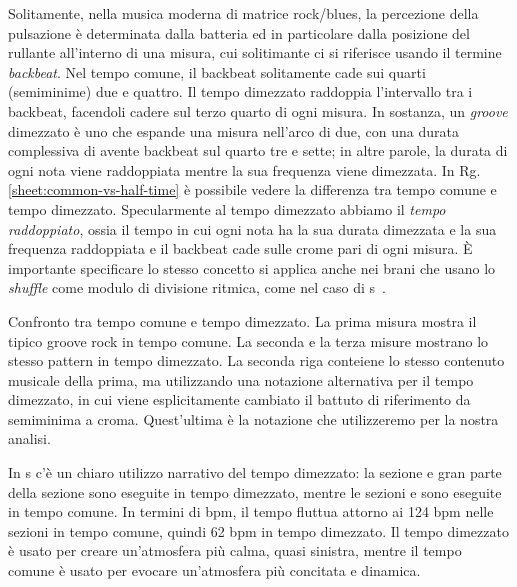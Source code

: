\documentclass[class=book, crop=false, oneside, 12pt]{standalone}
\begin{document}
    Solitamente, nella musica moderna di matrice rock/blues, la percezione della pulsazione  è determinata dalla batteria ed in particolare dalla posizione del rullante all'interno di una misura, cui solitimante ci si riferisce usando il termine \emph{backbeat}. Nel tempo comune, il backbeat solitamente cade  sui quarti (semiminime) due e quattro. Il tempo dimezzato raddoppia l'intervallo tra i backbeat, facendoli cadere sul terzo quarto di ogni misura. In sostanza, un \emph{groove} dimezzato è uno che espande una misura nell'arco di due, con una durata complessiva di  avente backbeat sul quarto tre e sette; in altre parole, la durata di ogni nota viene raddoppiata mentre la sua frequenza viene dimezzata. In Rg.\ref{sheet:common-vs-half-time} è possibile vedere la differenza tra tempo comune e tempo dimezzato. Specularmente al tempo dimezzato abbiamo il \emph{tempo raddoppiato}, ossia il tempo in cui ogni nota ha la sua durata dimezzata e la sua frequenza raddoppiata e il backbeat cade sulle crome pari di ogni misura. È importante specificare lo stesso concetto si applica anche nei brani che usano lo \emph{shuffle} come modulo di divisione ritmica, come nel caso di \acrshort{s}~\cite{randel2003harvard}.

    \begin{sheet}[htb]
        \centering
        \caption[Confronto tra tempo comune e tempo dimezzato.]{Confronto tra tempo comune e tempo dimezzato. La prima misura mostra il tipico groove rock in tempo comune. La seconda e la terza misure mostrano lo stesso pattern in tempo dimezzato. La seconda riga conteiene lo stesso contenuto musicale della prima, ma utilizzando una notazione alternativa per il tempo dimezzato, in cui viene esplicitamente cambiato il battuto di riferimento da semiminima a croma. Quest'ultima è la notazione che utilizzeremo per la nostra analisi.}
        \label{sheet:common-vs-half-time}
    \end{sheet}

    In \acrshort{s} c'è un chiaro utilizzo narrativo del tempo dimezzato: la sezione  e gran parte della sezione  sono eseguite in tempo dimezzato, mentre le sezioni  e  sono eseguite in tempo comune. In termini di bpm, il tempo fluttua attorno ai 124 bpm nelle sezioni in tempo comune, quindi 62 bpm in tempo dimezzato. Il tempo dimezzato è usato per creare un'atmosfera più calma, quasi sinistra, mentre il tempo comune è usato per evocare un'atmosfera più concitata e dinamica.
\end{document}
